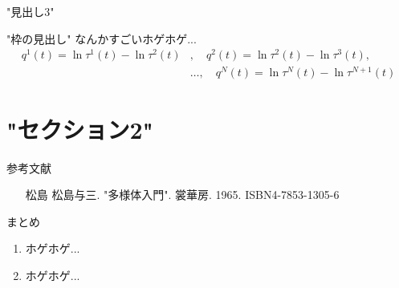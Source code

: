 \documentclass[aspectratio=169, dvipdfmx, 12pt]{beamer}
\begin{document}
\begin{frame}{"見出し3"}
    \begin{block}{"枠の見出し"}
        なんかすごいホゲホゲ...
        \begin{align*}
            q^1 (t) = \ln \tau^1 (t) - \ln \tau^2 (t)&,\quad q^2 (t) = \ln \tau^2 (t) - \ln \tau^3 (t), \\
            &\ldots, \quad q^N (t) = \ln \tau^N (t) - \ln \tau^{N+1} (t) 
        \end{align*}
    \end{block}
\end{frame}

\section{"セクション2"}

\begin{frame}{参考文献}
    \begin{itemize}
        \item[松島] 松島与三. "多様体入門". 裳華房. 1965. ISBN4-7853-1305-6
    \end{itemize}
\end{frame}

\begin{frame}{まとめ} %
    \begin{enumerate}
        \item ホゲホゲ...
        \item ホゲホゲ...
    \end{enumerate}
\end{frame}
\end{document}
